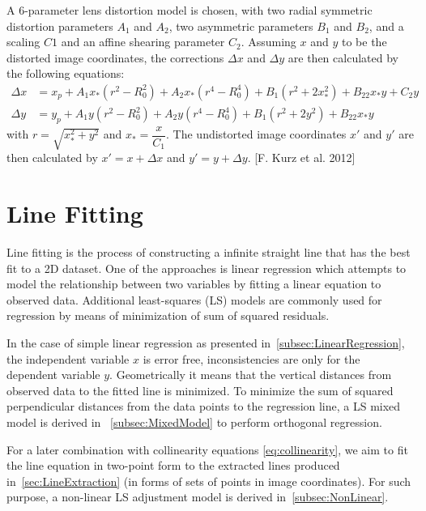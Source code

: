 A 6-parameter lens distortion model is chosen, with two radial symmetric distortion parameters $A_1$ and $A_2$, two asymmetric parameters $B_1$ and $B_2$, and a scaling $C1$ and an affine shearing parameter $C_2$. Assuming $x$ and $y$ to be the distorted image coordinates, the corrections $\Delta x$ and $\Delta y$ are then calculated by the following equations:
\begin{equation} \label{eq:LensDistortion}
\begin{split}
\Delta x &= x_p + A_1x_*(r^2-R_0^2) + A_2x_*(r^4-R_0^4) + B_1(r^2+2x_*^2) + B_22x_*y+C_2y \\
\Delta y &= y_p + A_1y  (r^2-R_0^2) + A_2y  (r^4-R_0^4) + B_1(r^2+2y^2)   + B_22x_*y
\end{split}
\end{equation}
with $r=\sqrt{x_*^2+y^2}$ and $x_*=\dfrac{x}{C_1}$. The undistorted image coordinates $x\prime$ and $y\prime$ are then calculated by $x\prime=x+\Delta x$ and $y\prime=y+\Delta y$. [F. Kurz et al. 2012] 



\section{Line Fitting}
\label{sec:LineFitting}

Line fitting is the process of constructing a infinite straight line that has the best fit to a 2D dataset. One of the approaches is linear regression which attempts to model the relationship between two variables by fitting a linear equation to observed data. %
Additional least-squares (LS) models are commonly used for regression by means of minimization of sum of squared residuals.

In the case of simple linear regression as presented in~\cref{subsec:LinearRegression}, the independent variable $x$ is error free, inconsistencies are only for the dependent variable $y$. Geometrically it means that the vertical distances from observed data to the fitted line is minimized. To minimize the sum of squared perpendicular distances from the data points to the regression line, a LS mixed model is derived in ~\cref{subsec:MixedModel} to perform orthogonal regression.

For a later combination with collinearity equations \eqref{eq:collinearity}, we aim to fit the line equation in two-point form to the extracted lines produced in~\cref{sec:LineExtraction} (in forms of sets of points in image coordinates). For such purpose, a non-linear LS adjustment model is derived in~\cref{subsec:NonLinear}. 


